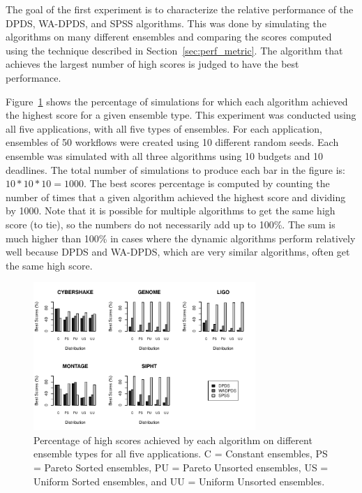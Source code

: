 \documentclass[conference]{IEEEtran}
\begin{document}
The goal of the first experiment is to characterize the relative performance of the DPDS, WA-DPDS, and SPSS algorithms. This was done by simulating the algorithms on many different ensembles and comparing the scores computed using the technique described in Section~\ref{sec:perf_metric}. The algorithm that achieves the largest number of high scores is judged to have the best performance.

Figure~\ref{fig:distributions} shows the percentage of simulations for which each algorithm achieved the highest score for a given ensemble type. This experiment was conducted using all five applications, with all five types of ensembles. For each application, ensembles of 50 workflows were created using 10 different random seeds. Each ensemble was simulated with all three algorithms using 10 budgets and 10 deadlines. The total number of simulations to produce each bar in the figure is: $10 * 10 * 10 = 1000$. The best scores percentage is computed by counting the number of times that a given algorithm achieved the highest score and dividing by 1000. Note that it is possible for multiple algorithms to get the same high score (to tie), so the numbers do not necessarily add up to 100\%. The sum is much higher than 100\% in cases where the dynamic algorithms perform relatively well because DPDS and WA-DPDS, which are very similar algorithms, often get the same high score.

\begin{figure}[ht]
    \centering
    \includegraphics[width=0.75\textwidth]{run-finish-variations-test-0-output-distributions}
    \caption[Percentage of high scores achieved by each algorithm on different ensemble types for all five applications.]{Percentage of high scores achieved by each algorithm on different ensemble types for all five applications. C = Constant ensembles, PS = Pareto Sorted ensembles, PU = Pareto Unsorted ensembles, US = Uniform Sorted ensembles, and UU = Uniform Unsorted ensembles.}
    \label{fig:distributions}
\end{figure}
\end{document}
